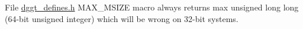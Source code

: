 
\begin{DoxyRefList}
\item[File \mbox{\hyperlink{dggt__defines_8h}{dggt\+\_\+defines.h}} ]\label{bug__bug000001}%
%
M\+A\+X\+\_\+\+M\+S\+I\+ZE macro always returns max unsigned long long (64-\/bit unsigned integer) which will be wrong on 32-\/bit systems. 
\end{DoxyRefList}